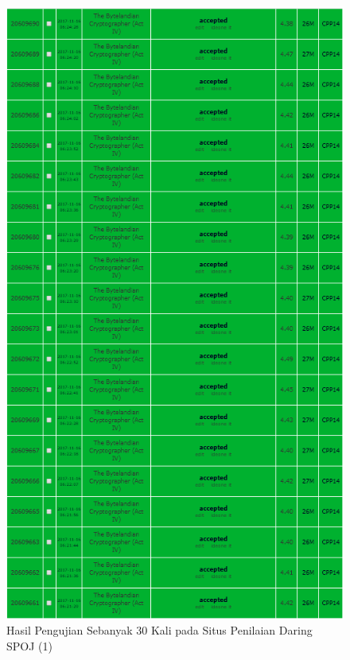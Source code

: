   	\begin{figure}[H]
  	\centering
  	 \includegraphics[scale=0.63]{images/lampiran/uji1.png}
  	\caption{Hasil Pengujian Sebanyak 30 Kali pada Situs Penilaian Daring SPOJ (1)}
  	\label{fig:submission1}
  \end{figure}
  
